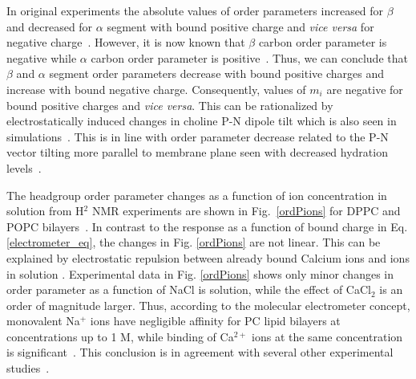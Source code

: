 \documentclass[pre,aps,floatfix,authordate1-4,twocolumn]{revtex4-1}
\begin{document}
In original experiments the absolute values of order parameters 
increased for $\beta$ and decreased for $\alpha$ segment with bound positive charge
and {\it vice versa} for negative charge~\cite{akutsu81,altenbach84,altenbach85,seelig87,scherer89,rydall92}. 
However, it is now known that 
$\beta$ carbon order parameter is negative while $\alpha$ carbon order parameter is 
positive~\cite{hong95a,hong95b,gross97}. Thus, we can conclude 
that $\beta$ and $\alpha$ segment order parameters decrease with bound positive charges 
and increase with bound negative charge. Consequently, values of $m_i$ are negative for
bound positive charges and {\it vice versa}. This can be rationalized by electrostatically 
induced changes in choline P-N dipole tilt \cite{seelig87,scherer89,seelig90} which is also
seen in simulations~\cite{cordomi08,cordomi09,zhao12}. This is in line with order parameter decrease 
related to the P-N vector tilting more parallel to membrane plane seen with decreased hydration levels~\cite{botan15}. 


The headgroup order parameter changes as a function of ion concentration in
solution from H$^2$ NMR experiments are shown in Fig.~\ref{ordPions} for DPPC and POPC bilayers~\cite{akutsu81,altenbach84}.
In contrast to the response as a function of bound charge in 
Eq. \ref{electrometer_eq}, the changes in Fig. \ref{ordPions}
are not linear. This can be explained by electrostatic repulsion between
already bound Calcium ions and ions in solution \cite{altenbach84}.
Experimental data in Fig. \ref{ordPions} shows only minor changes in order
parameter as a function of NaCl is solution, 
while the effect of CaCl$_2$ is an order of magnitude larger. 
Thus, according to the molecular electrometer concept, 
monovalent Na$^+$ ions have negligible affinity for PC lipid bilayers at concentrations up to 1 M,
while binding of Ca$^{2+}$ ions at the same concentration is significant~\cite{akutsu81,altenbach84}. 
This conclusion is in agreement with several other experimental 
studies~\cite{cevc90,tocanne90,binder02,pabst07,filippov09}.
\end{document}
